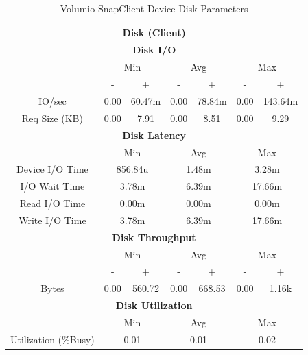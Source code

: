 \documentclass[11pt,a4paper]{scrreprt}
\begin{document}
\begin{table}[H]
\centering
    \begin{tabular}{||c|c|c|c|c|c|c||}
    \hline
    \multicolumn{7}{|c|}{\textbf{Disk (Client)}} \\
    \hline
    \multicolumn{7}{|c|}{\textbf{Disk I/O}} \\
    \hline\hline
      & \multicolumn{2}{|c|}{Min} & \multicolumn{2}{|c|}{Avg} & \multicolumn{2}{|c|}{Max} \\
    \hline
      & - & + & - & + & - & + \\
    \hline
    IO/sec & 0.00 & 60.47m & 0.00 & 78.84m & 0.00 & 143.64m \\
    \hline
    Req Size (KB) & 0.00 & 7.91 & 0.00 & 8.51 & 0.00 & 9.29 \\
    \hline\hline
    \multicolumn{7}{|c|}{\textbf{Disk Latency}} \\
    \hline\hline
      & \multicolumn{2}{|c|}{Min} & \multicolumn{2}{|c|}{Avg} & \multicolumn{2}{|c|}{Max} \\
    \hline
    Device I/O Time  & \multicolumn{2}{|c|}{856.84u} & \multicolumn{2}{|c|}{1.48m} & \multicolumn{2}{|c|}{3.28m} \\
    \hline
    I/O Wait Time  & \multicolumn{2}{|c|}{3.78m} & \multicolumn{2}{|c|}{6.39m} & \multicolumn{2}{|c|}{17.66m} \\
    \hline
    Read I/O Time  & \multicolumn{2}{|c|}{0.00m} & \multicolumn{2}{|c|}{0.00m} & \multicolumn{2}{|c|}{0.00m} \\
    \hline
    Write I/O Time  & \multicolumn{2}{|c|}{3.78m} & \multicolumn{2}{|c|}{6.39m} & \multicolumn{2}{|c|}{17.66m} \\
    \hline\hline
    \multicolumn{7}{|c|}{\textbf{Disk Throughput}} \\
    \hline\hline
      & \multicolumn{2}{|c|}{Min} & \multicolumn{2}{|c|}{Avg} & \multicolumn{2}{|c|}{Max} \\
    \hline
      & - & + & - & + & - & + \\
    \hline
    Bytes & 0.00 & 560.72 & 0.00 & 668.53 & 0.00 & 1.16k \\
    \hline\hline
    \multicolumn{7}{|c|}{\textbf{Disk Utilization}} \\
    \hline\hline
      & \multicolumn{2}{|c|}{Min} & \multicolumn{2}{|c|}{Avg} & \multicolumn{2}{|c|}{Max} \\
    \hline
    Utilization (\%Busy)  & \multicolumn{2}{|c|}{0.01} & \multicolumn{2}{|c|}{0.01} & \multicolumn{2}{|c|}{0.02} \\
    \hline\hline
    \end{tabular}
    \caption{Volumio SnapClient Device Disk Parameters}
    \label{VolumioclientDiskTab}
\end{table}
\end{document}
